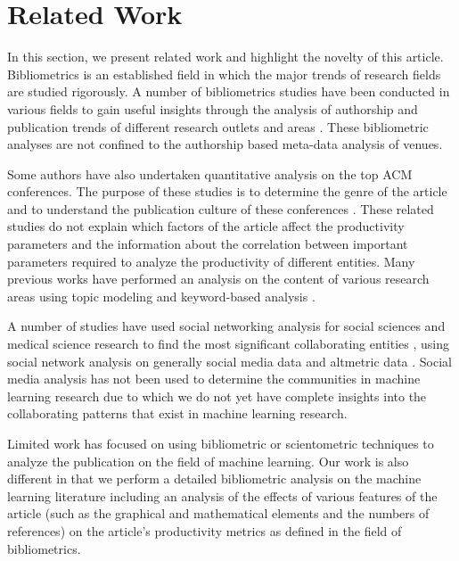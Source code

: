 \section{Related Work}
\label{sec:relatedwork}

In this section, we present related work and highlight the novelty of this article. Bibliometrics is an established field in which the major trends of research fields are studied rigorously. A number of bibliometrics studies have been conducted in various fields to gain useful insights through the analysis of authorship and publication trends of different research outlets and areas  \citep{nobre2017scientific,fernandes2017evolution,serenko2009scientometric,chiu2010publish, rajendran2011scientometric,nattar2009indian,yin2017dancing,iqbal2019bibliometric,iqbal2019five}. These bibliometric analyses are not confined to the authorship based meta-data analysis of venues. 

Some authors have also undertaken quantitative analysis on the top ACM conferences. The purpose of these studies is to determine the genre of the article and to understand the publication culture of these conferences \citep{flittner2018survey}. These related studies do not explain which factors of the article affect the productivity parameters and the information about the correlation between important parameters required to analyze the productivity of different entities. Many previous works have performed an analysis on the content of various research areas using topic modeling \citep{paul2009topic} and keyword-based analysis \citep{choi2011analysis}.

A number of studies have used social networking analysis for social sciences and medical science research to find the most significant collaborating entities \citep{savic2017analysis,wagner2017growth,didegah2018co,borgatti2009network,waheed2018bibliometric}, using social network analysis on generally social media data and altmetric data \citep{hassan2017measuring}. Social media analysis has not been used to determine the communities in machine learning research due to which we do not yet have complete insights into the collaborating patterns that exist in machine learning research. 

Limited work has focused on using bibliometric or scientometric techniques to analyze the publication on the field of machine learning.  Our work is also different in that we perform a detailed bibliometric analysis on the machine learning literature including an analysis of the effects of various features of the article (such as the graphical and mathematical elements and the numbers of references) on the article's productivity metrics as defined in the field of bibliometrics.


